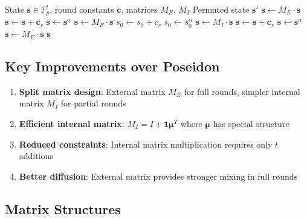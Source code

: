 \documentclass[11pt,a4paper]{article}
\begin{document}
\begin{algorithm}
\caption{Poseidon2 Permutation}
\label{alg:poseidon2}
\begin{algorithmic}[1]
\Require State $\mathbf{s} \in \mathbb{F}_p^t$, round constants $\mathbf{c}$, matrices $M_E$, $M_I$
\Ensure Permuted state $\mathbf{s}'$
\State $\mathbf{s} \gets M_E \cdot \mathbf{s}$ 
 
    \State $\mathbf{s} \gets \mathbf{s} + \mathbf{c}_r$ 
    \State $\mathbf{s} \gets \mathbf{s}^{\alpha}$ 
    \State $\mathbf{s} \gets M_E \cdot \mathbf{s}$ 
\EndFor
{} 
    \State $s_0 \gets s_0 + c_r$ 
    \State $s_0 \gets s_0^{\alpha}$ 
    \State $\mathbf{s} \gets M_I \cdot \mathbf{s}$ 
\EndFor
{} 
    \State $\mathbf{s} \gets \mathbf{s} + \mathbf{c}_r$
    \State $\mathbf{s} \gets \mathbf{s}^{\alpha}$
    \State $\mathbf{s} \gets M_E \cdot \mathbf{s}$
\EndFor
\Return $\mathbf{s}$
\end{algorithmic}
\end{algorithm}

\subsection{Key Improvements over Poseidon}

\begin{enumerate}
    \item \textbf{Split matrix design}: External matrix $M_E$ for full rounds, simpler internal matrix $M_I$ for partial rounds
    \item \textbf{Efficient internal matrix}: $M_I = I + \mathbf{1}\mathbf{\mu}^T$ where $\mathbf{\mu}$ has special structure
    \item \textbf{Reduced constraints}: Internal matrix multiplication requires only $t$ additions
    \item \textbf{Better diffusion}: External matrix provides stronger mixing in full rounds
\end{enumerate}

\subsection{Matrix Structures}
\end{document}
